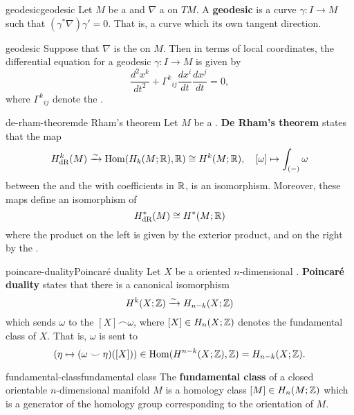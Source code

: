 \begin{topic}{geodesic}{geodesic}
    Let $M$ be a  and $\nabla$ a  on $TM$. A \textbf{geodesic} is a curve $\gamma \colon I \to M$ such that $(\gamma^* \nabla) \gamma' = 0$. That is, a curve which  its own tangent direction.
\end{topic}

\begin{example}{geodesic}
    Suppose that $\nabla$ is the  on $M$. Then in terms of local coordinates, the differential equation for a geodesic $\gamma \colon I \to M$ is given by
    \[ \frac{d^2 x^k}{d t^2} + {\Gamma^k}_{ij} \frac{dx^i}{dt} \frac{dx^j}{dt} = 0 , \]
    where ${\Gamma^k}_{ij}$ denote the .
\end{example}

\begin{topic}{de-rham-theorem}{de Rham's theorem}
    Let $M$ be a . \textbf{De Rham's theorem} states that the map
    \[ H_{\textup{dR}}^k(M) \xrightarrow{\sim} \operatorname{Hom}(H_k(M; \mathbb{R}), \mathbb{R}) \cong H^k(M; \mathbb{R}), \quad [ \omega ] \mapsto \int_{(-)} \omega \]
    between the  and the  with coefficients in $\mathbb{R}$, is an isomorphism. Moreover, these maps define an isomorphism of 
    \[ H_{\textup{dR}}^*(M) \cong H^*(M; \mathbb{R}) \]
    where the product on the left is given by the exterior product, and on the right by the .
\end{topic}

\begin{topic}{poincare-duality}{Poincaré duality}
    Let $X$ be a  oriented $n$-dimensional . \textbf{Poincaré duality} states that there is a canonical isomorphism
    \[ H^k(X; \mathbb{Z}) \xrightarrow{\sim} H_{n - k}(X; \mathbb{Z}) \]
    which sends $\omega$ to the  $[X] \frown \omega$, where $[X] \in H_n(X; \mathbb{Z})$ denotes the fundamental class of $X$. That is, $\omega$ is sent to
    \[ (\eta \mapsto (\omega \smile \eta)([X])) \in \operatorname{Hom}(H^{n - k}(X; \mathbb{Z}), \mathbb{Z}) = H_{n - k}(X; \mathbb{Z}) . \]
\end{topic}

\begin{topic}{fundamental-class}{fundamental class}
    The \textbf{fundamental class} of a closed orientable $n$-dimensional manifold $M$ is a homology class $[M] \in H_n(M; \mathbb{Z})$ which is a generator of the homology group corresponding to the orientation of $M$.
\end{topic}

